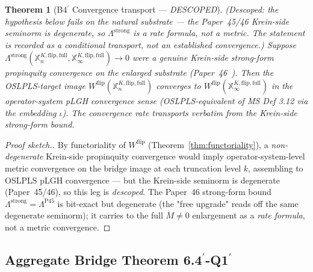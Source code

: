 \documentclass[11pt,a4paper]{article}
\theoremstyle{plain}
\newtheorem{theorem}{Theorem}[section]
\theoremstyle{definition}
\newcommand{\Wflip}{W^{\mathrm{flip}}}
\newcommand{\osXkrein}{\mathbb{X}^{K,\mathrm{flip},\mathrm{full}}}
\begin{document}
\begin{theorem}[B4$^{\prime}$ Convergence transport --- \emph{DESCOPED}]
\label{thm:b4prime}
\emph{(Descoped: the hypothesis below fails on the natural substrate ---
the Paper~45/46 Krein-side seminorm is degenerate, so
$\Lambda^{\mathrm{strong}}$ is a rate formula, not a metric. The
statement is recorded as a conditional transport, not an established
convergence.)}
Suppose $\Lambda^{\mathrm{strong}}(\osXkrein_{n},\osXkrein_{\infty})\to 0$
were a genuine Krein-side strong-form propinquity convergence on the
enlarged substrate (Paper~46~\cite{paper46}). Then the OSLPLS-target image
$\Wflip(\osXkrein_{n})$ converges to $\Wflip(\osXkrein_{\infty})$
in the operator-system pLGH convergence sense (OSLPLS-equivalent of
MS Def 3.12 via the embedding $\iota$). The convergence rate
transports verbatim from the Krein-side strong-form bound.
\end{theorem}

\begin{proof}[Proof sketch.]
By functoriality of $\Wflip$ (Theorem~\ref{thm:functoriality}), a
\emph{non-degenerate} Krein-side propinquity convergence would imply
operator-system-level metric convergence on the bridge image at each
truncation level $k$, assembling to OSLPLS pLGH convergence --- but the
Krein-side seminorm is degenerate (Paper~45/46), so this leg is
\emph{descoped}.
The Paper~46 strong-form bound $\Lambda^{\mathrm{strong}}=
\Lambda^{\mathrm{P45}}$ is bit-exact but degenerate (the "free upgrade"
reads off the same degenerate seminorm); it carries to the full
$M\ne 0$ enlargement as a \emph{rate formula}, not a metric convergence.
\end{proof}

\subsection{Aggregate Bridge Theorem 6.4$^{\prime}$-Q1$^{\prime}$}
\label{sec:aggregate_bridge_theorem}
\end{document}

